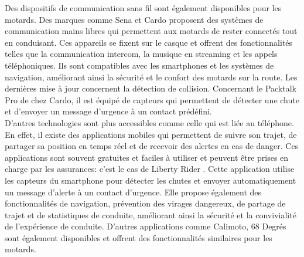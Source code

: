 Des dispositifs de communication sans fil sont également disponibles pour les motards. Des marques comme Sena et Cardo\cite{cardo} proposent des systèmes de communication mains libres qui permettent aux motards de rester connectés tout en conduisant. Ces appareils se fixent sur le casque et offrent des fonctionnalités telles que la communication intercom, la musique en streaming et les appels téléphoniques. Ils sont compatibles avec les smartphones et les systèmes de navigation, améliorant ainsi la sécurité et le confort des motards sur la route. Les dernières mise à jour concernent la détection de collision. Concernant le Packtalk Pro de chez Cardo, il est équipé de capteurs qui permettent de détecter une chute et d'envoyer un message d'urgence à un contact prédéfini.\\
D'autres technologies sont plus accessibles comme celle qui est liée au téléphone. En effet, il existe des applications mobiles qui permettent de suivre son trajet, de partager sa position en temps réel et de recevoir des alertes en cas de danger. Ces applications sont souvent gratuites et faciles à utiliser et peuvent être prises en charge par les assurances: c'est le cas de Liberty Rider \cite{liberty_rider}. Cette application utilise les capteurs du smartphone pour détecter les chutes et envoyer automatiquement un message d'alerte à un contact d’urgence. Elle propose également des fonctionnalités de navigation, prévention des virages dangereux, de partage de trajet et de statistiques de conduite, améliorant ainsi la sécurité et la convivialité de l’expérience de conduite. D'autres applications comme Calimoto, 68 Degrés sont également disponibles et offrent des fonctionnalités similaires pour les motards.\\
\vspace{0.5cm}

